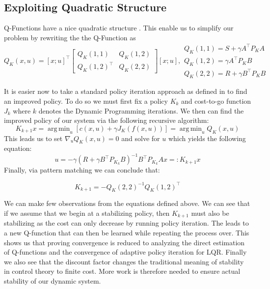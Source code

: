 \documentclass{article}[12pt]
\DeclareMathOperator*{\argmin}{arg\,min}
\begin{document}
\subsection{Exploiting Quadratic Structure}
Q-Functions have a nice quadratic structure \cite{Brad94}. This enable us to simplify our problem by rewriting the the Q-Function as 
\begin{equation}\label{eq:12}
    Q_{K}(x, u)=[x ; u]^{\top}\left[\begin{array}{cc}{Q_{K}(1,1)} & {Q_{K}(1,2)} \\ {Q_{K}(1,2)^{\top}} & {Q_{K}(2,2)}\end{array}\right][x ; u], 
    \begin{array}{l}{Q_{K}(1,1)=S+\gamma A^{\top} P_{K} A} \\ {Q_{K}(1,2)=\gamma A^{\top} P_{K} B} \\ {Q_{K}(2,2)=R+\gamma B^{\top} P_{K} B}\end{array}
\end{equation}

It is easier now to take a standard policy iteration approach as defined in \cite{Sutton} to find an improved policy. To do so we must first fix a policy $K_k$ and cost-to-go function $J_k$ where $k$ denotes the Dynamic Programming iterations. We then can find the improved policy of our system via the following recursive algorithm:
\begin{equation}\label{eq:13}
    K_{k+1}x = \argmin_u\left[c(x,u)+\gamma J_K(f(x,u))\right] = \argmin_u Q_K(x,u)
\end{equation}
This leads us to set $\nabla_u Q_K(x,u)=0$ and solve for $u$ which yields the following equation:
\begin{equation}\label{eq:14}
    u = -\gamma (R+\gamma B^\top P_{K_k} B)^{-1}B^\top P_{K_k}Ax =: K_{k+1}x
\end{equation}
Finally, via pattern matching we can conclude that:

\begin{equation}\label{eq:15}
    K_{k+1}=-Q_{K}(2,2)^{-1} Q_{K}(1,2)^{\top}
\end{equation}

We can make few observations from the equations defined above. We can see that if we assume that we begin at a stabilizing policy, then $K_{k+1}$ must also be stabilizing as the cost can only decrease by running policy iteration. The leads to a new Q-function that can then be learned while repeating the process over. This shows us that proving convergence is reduced to analyzing the direct estimation of Q-functions and the convergence of adaptive policy iteration for LQR. Finally we also see that the discount factor changes the traditional meaning of stability in control theory to finite cost. More work is therefore needed to ensure actual stability of our dynamic system.
\end{document}
